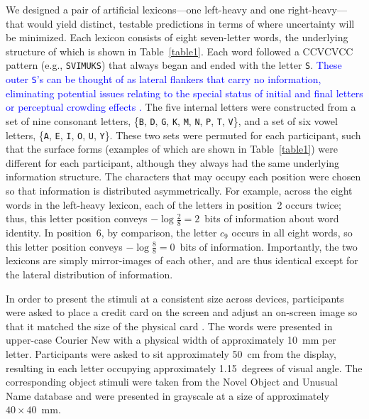 \documentclass[doc,biblatex]{apa7}
\newcommand\newmaterial[1]{\textcolor{blue}{#1}}
\begin{document}
We designed a pair of artificial lexicons---one left-heavy and one right-heavy---that would yield distinct, testable predictions in terms of where uncertainty will be minimized. Each lexicon consists of eight seven-letter words, the underlying structure of which is shown in Table~\ref{table1}. Each word followed a CCVCVCC pattern (e.g., \texttt{SVIMUKS}) that always began and ended with the letter \texttt{S}. \newmaterial{These outer \texttt{S}'s can be thought of as lateral flankers that carry no information, eliminating potential issues relating to the special status of initial and final letters \parencite{Johnson:2012, White:2008} or perceptual crowding effects \parencite{Pelli:2008}.} The five internal letters were constructed from a set of nine consonant letters, \{\texttt{B}, \texttt{D}, \texttt{G}, \texttt{K}, \texttt{M}, \texttt{N}, \texttt{P}, \texttt{T}, \texttt{V}\}, and a set of six vowel letters, \{\texttt{A}, \texttt{E}, \texttt{I}, \texttt{O}, \texttt{U}, \texttt{Y}\}. These two sets were permuted for each participant, such that the surface forms (examples of which are shown in Table~\ref{table1}) were different for each participant, although they always had the same underlying information structure. The characters that may occupy each position were chosen so that information is distributed asymmetrically. For example, across the eight words in the left-heavy lexicon, each of the letters in position~2 occurs twice; thus, this letter position conveys $-\log \frac{2}{8} = 2$~bits of information about word identity. In position~6, by comparison, the letter $c_9$ occurs in all eight words, so this letter position conveys $-\log \frac{8}{8} = 0$~bits of information. Importantly, the two lexicons are simply mirror-images of each other, and are thus identical except for the lateral distribution of information.

In order to present the stimuli at a consistent size across devices, participants were asked to place a credit card on the screen and adjust an on-screen image so that it matched the size of the physical card \parencite{Li:2020}. The words were presented in upper-case Courier New with a physical width of approximately 10~mm per letter. Participants were asked to sit approximately 50~cm from the display, resulting in each letter occupying approximately 1.15~degrees of visual angle. The corresponding object stimuli were taken from the Novel Object and Unusual Name database \parencite{Horst:2016} and were presented in grayscale at a size of approximately $40 \times 40$~mm.
\end{document}
